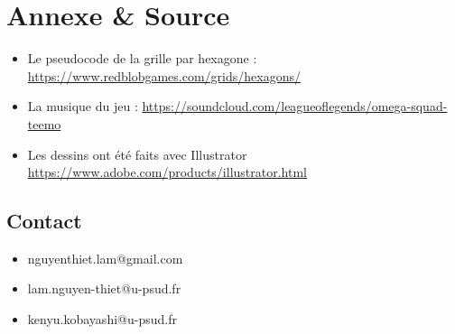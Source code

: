 \documentclass{article}
\begin{document}
\section{Annexe \& Source}
\begin{itemize}
    \item Le pseudocode de la grille par hexagone : \url{https://www.redblobgames.com/grids/hexagons/}
    \item La musique du jeu : \url{https://soundcloud.com/leagueoflegends/omega-squad-teemo}
    \item Les dessins ont été faits avec Illustrator \url{https://www.adobe.com/products/illustrator.html}
\end{itemize}
\subsection{Contact}
\begin{itemize}
    \item nguyenthiet.lam@gmail.com
    \item lam.nguyen-thiet@u-psud.fr
    \item kenyu.kobayashi@u-psud.fr
\end{itemize}
\end{document}
